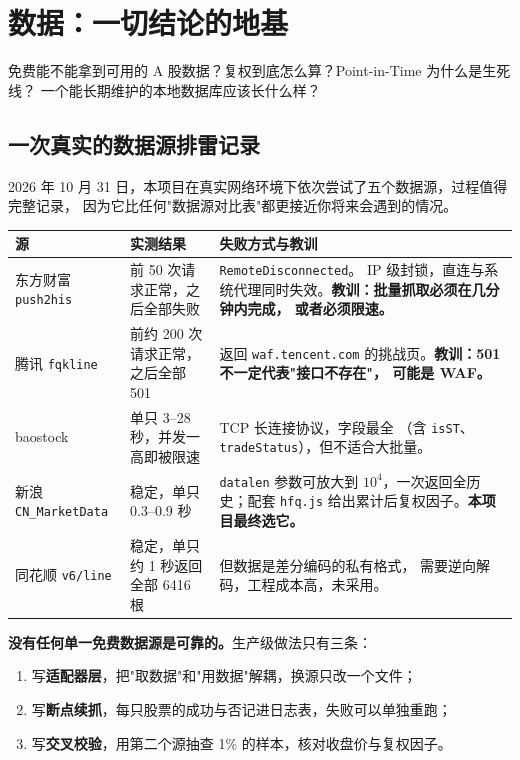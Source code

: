 \chapter{数据：一切结论的地基}\label{ch:data}

\begin{keybox}[本章要回答的问题]
免费能不能拿到可用的 A 股数据？复权到底怎么算？Point-in-Time 为什么是生死线？
一个能长期维护的本地数据库应该长什么样？
\end{keybox}

\section{一次真实的数据源排雷记录}

2026 年 10 月 31 日，本项目在真实网络环境下依次尝试了五个数据源，过程值得完整记录，
因为它比任何"数据源对比表"都更接近你将来会遇到的情况。

\begin{center}
\begin{longtable}{@{}p{}p{}p{}@{}}
\toprule
\textbf{源} & \textbf{实测结果} & \textbf{失败方式与教训} \\
\midrule
\endhead
东方财富 \texttt{push2his} & 前 50 次请求正常，之后全部失败 & \texttt{RemoteDisconnected}。
IP 级封锁，直连与系统代理同时失效。\textbf{教训：批量抓取必须在几分钟内完成，
或者必须限速。} \\
\midrule
腾讯 \texttt{fqkline} & 前约 200 次请求正常，之后全部 501 & 返回
\texttt{waf.tencent.com} 的挑战页。\textbf{教训：501 不一定代表"接口不存在"，
可能是 WAF。} \\
\midrule
baostock & 单只 3--28 秒，并发一高即被限速 & TCP 长连接协议，字段最全
（含 \texttt{isST}、\texttt{tradeStatus}），但不适合大批量。 \\
\midrule
新浪 \texttt{CN\_MarketData} & 稳定，单只 0.3--0.9 秒 & \texttt{datalen} 参数可放大到
$10^4$，一次返回全历史；配套 \texttt{hfq.js} 给出累计后复权因子。\textbf{本项目最终选它。} \\
\midrule
同花顺 \texttt{v6/line} & 稳定，单只约 1 秒返回全部 6416 根 & 但数据是差分编码的私有格式，
需要逆向解码，工程成本高，未采用。 \\
\bottomrule
\end{longtable}
\end{center}

\begin{warnbox}[这段经历本身就是结论]
\textbf{没有任何单一免费数据源是可靠的。}生产级做法只有三条：
\begin{enumerate}
  \item 写\textbf{适配器层}，把"取数据"和"用数据"解耦，换源只改一个文件；
  \item 写\textbf{断点续抓}，每只股票的成功与否记进日志表，失败可以单独重跑；
  \item 写\textbf{交叉校验}，用第二个源抽查 1\% 的样本，核对收盘价与复权因子。
\end{enumerate}
\end{warnbox}

